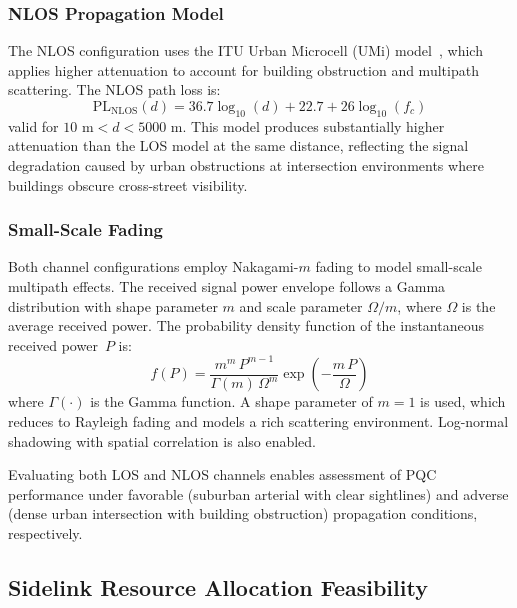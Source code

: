 \documentclass[letterpaper,journal]{IEEEtran}
\begin{document}
\subsubsection{NLOS Propagation Model}

The NLOS configuration uses the ITU Urban Microcell (UMi) model~\cite{itur_m2135}, which applies higher attenuation to account for building obstruction and multipath scattering. The NLOS path loss is:
\begin{equation}
    \text{PL}_\text{NLOS}(d) = 36.7\log_{10}(d) + 22.7 + 26\log_{10}(f_c)
    \label{eq:pl_nlos}
\end{equation}
valid for $10\text{~m} < d < 5000\text{~m}$. This model produces substantially higher attenuation than the LOS model at the same distance, reflecting the signal degradation caused by urban obstructions at intersection environments where buildings obscure cross-street visibility.

\subsubsection{Small-Scale Fading}

Both channel configurations employ Nakagami-$m$ fading to model small-scale multipath effects. The received signal power envelope follows a Gamma distribution with shape parameter $m$ and scale parameter $\Omega/m$, where $\Omega$ is the average received power. The probability density function of the instantaneous received power~$P$ is:
\begin{equation}
    f(P) = \frac{m^m \, P^{m-1}}{\Gamma(m) \, \Omega^m} \exp\!\left(-\frac{m \, P}{\Omega}\right)
    \label{eq:nakagami}
\end{equation}
where $\Gamma(\cdot)$ is the Gamma function. A shape parameter of $m = 1$ is used, which reduces to Rayleigh fading and models a rich scattering environment. Log-normal shadowing with spatial correlation is also enabled.

Evaluating both LOS and NLOS channels enables assessment of PQC performance under favorable (suburban arterial with clear sightlines) and adverse (dense urban intersection with building obstruction) propagation conditions, respectively.

\subsection{Sidelink Resource Allocation Feasibility}
\label{sec:resource_feasibility}
\end{document}
